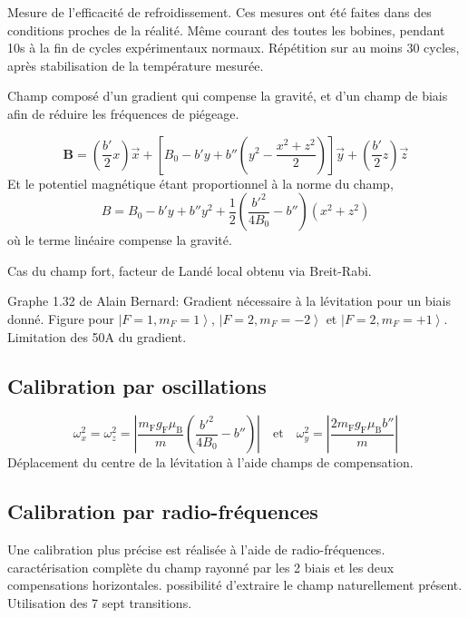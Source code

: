 Mesure de l'efficacité de refroidissement. Ces mesures ont été faites dans des conditions proches de la réalité. Même courant des toutes les bobines, pendant 10s à la fin de cycles expérimentaux normaux. Répétition sur au moins 30 cycles, après stabilisation de la température mesurée.










Champ composé d'un gradient qui compense la gravité, et d'un champ de biais afin de réduire les fréquences de piégeage. 

\begin{equation}
\mathbf{B}=\left( \frac{b'}{2}x \right) \vec{x} + \left[ B_0 - b'y + b'' \left( y^2 - \frac{x^2+z^2}{2} \right) \right] \vec{y} + \left( \frac{b'}{2}z \right) \vec{z}
\end{equation}
Et le potentiel magnétique étant proportionnel à la norme du champ, 
\begin{equation}
B=B_0 -b' y + b'' y^2 +\frac{1}{2} \left( \frac{b'^2}{4 B_0} - b'' \right) \left( x^2 + z^2 \right) 
\end{equation}
où le terme linéaire compense la gravité.

Cas du champ fort, facteur de Landé local obtenu via Breit-Rabi.

Graphe 1.32 de Alain Bernard: Gradient nécessaire à la lévitation pour un biais donné. Figure pour $\left| F=1, m_F=1 \right\rangle$, $\left| F=2, m_F=-2 \right\rangle$ et $\left| F=2, m_F=+1 \right\rangle$. Limitation des 50A du gradient.


\subsection{Calibration par oscillations}

\begin{equation}
\omega_x^2=\omega_z^2=\left| \frac{m_{\mathrm{F}} g_{\mathrm{F}} \mu_{\mathrm{B}}}{m} \left( \frac{b'^2}{4 B_0} - b'' \right) \right|
\quad \text{et} \quad
\omega_y^2= \left| \frac{2 m_{\mathrm{F}} g_{\mathrm{F}} \mu_{\mathrm{B}} b''}{m} \right|
\end{equation}
Déplacement du centre de la lévitation à l'aide champs de compensation.




\subsection{Calibration par radio-fréquences}
Une calibration plus précise est réalisée à l'aide de radio-fréquences.
caractérisation complète du champ rayonné par les 2 biais et les deux compensations horizontales. possibilité d'extraire le champ naturellement présent. Utilisation des 7 sept transitions. 




